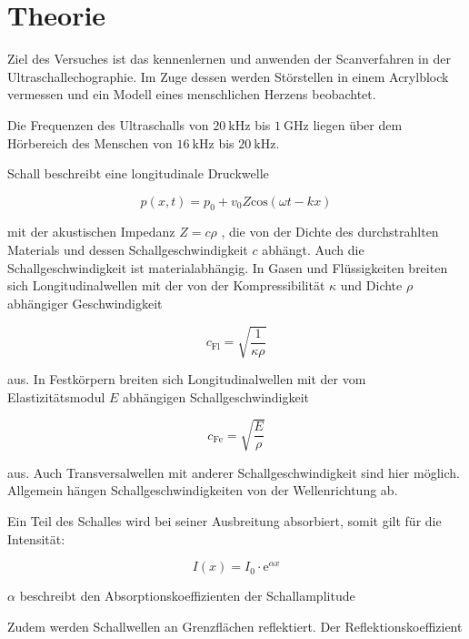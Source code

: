 \section{Theorie}
\label{sec:Theorie}

Ziel des Versuches ist das kennenlernen und anwenden der Scanverfahren
in der Ultraschallechographie. Im Zuge dessen werden Störstellen in einem 
Acrylblock vermessen und ein Modell eines menschlichen Herzens beobachtet.

Die Frequenzen des Ultraschalls von $\SI{20}{\kilo\hertz}$ bis
$\SI{1}{\giga\hertz}$ liegen über dem Hörbereich des Menschen
von $\SI{16}{\kilo\hertz}$ bis $\SI{20}{\kilo\hertz}$.

Schall beschreibt eine longitudinale Druckwelle

\begin{equation}
    p(x, t) = p_0 + v_0 Z \text{cos} \left(\omega t - k x \right)
\end{equation}

mit der akustischen Impedanz $Z = c\rho$ , die von der Dichte des
durchstrahlten Materials und dessen Schallgeschwindigkeit $c$ abhängt.
Auch die Schallgeschwindigkeit ist materialabhängig.
In Gasen und Flüssigkeiten breiten sich Longitudinalwellen mit der 
von der Kompressibilität $\kappa$ und Dichte $\rho$ abhängiger
Geschwindigkeit

\begin{equation}
    c_\text{Fl} = \sqrt{\frac{1}{\kappa \rho}}
\end{equation}

aus. In Festkörpern breiten sich Longitudinalwellen
mit der vom Elastizitätsmodul $E$ abhängigen Schallgeschwindigkeit 

\begin{equation}
    c_\text{Fe} = \sqrt{\frac{E}{\rho}}
\end{equation}

aus. Auch Transversalwellen mit anderer Schallgeschwindigkeit sind hier
möglich. Allgemein hängen Schallgeschwindigkeiten von der Wellenrichtung
ab.

Ein Teil des Schalles wird bei seiner Ausbreitung absorbiert, somit
gilt für die Intensität:

\begin{equation}
    I(x) = I_0 \cdot \text{e}^{\alpha x}
\end{equation}

$\alpha$ beschreibt den Absorptionskoeffizienten der Schallamplitude

Zudem werden Schallwellen an Grenzflächen reflektiert. Der Reflektionskoeffizient

